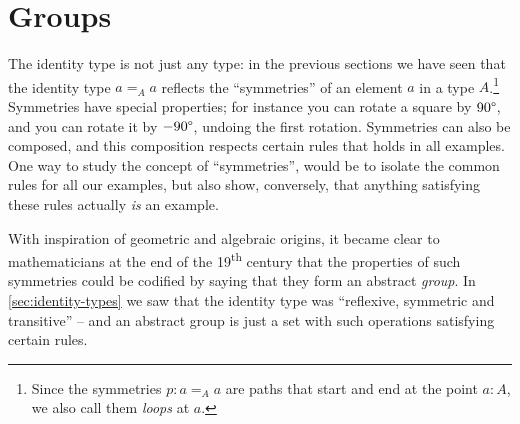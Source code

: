 \chapter{Groups}
\label{ch:groups}


The identity type is not just any type:  in the previous sections we have seen that the identity type $a=_Aa$ reflects the ``symmetries'' of an element $a$ in a type $A$.\footnote{%
  Since the symmetries $p : a=_A a$ are paths that start and end
  at the point $a:A$, we also call them \emph{loops} at $a$.\par
  }
Symmetries have special properties; for instance you can rotate a square by $90\textup{\textdegree}$, and you can rotate it by $-90\textup{\textdegree}$, undoing the first rotation.
Symmetries can also be composed, and this composition respects certain rules that holds in all examples.  One way to study the concept of ``symmetries'', would be to isolate the common rules for all our examples, but also show, conversely, that anything satisfying these rules actually \emph{is} an example. 




With inspiration of geometric and algebraic origins, it became clear to mathematicians at the end of the 19\textsuperscript{th} century that the properties of such symmetries could be codified by saying that they form an abstract \emph{group}.
In \cref{sec:identity-types} we saw that the identity type was ``reflexive, symmetric and transitive'' -- and an abstract group is just a set with such operations satisfying certain rules.


